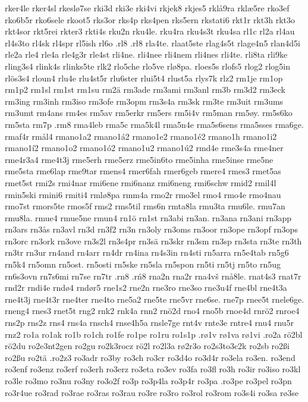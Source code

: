 {{rker4le
rker4sl
rkeslø7se
rki3d
rki3e
rki4vi
rkjek8
rkjes5
rklå9ra
rklæ5re
rko3ef
rko6b5r
rko6sele
rkoot5
rks3or
rks4p
rks4pen
rks5ern
rkstati6
rkt1r
rkt3h
rkt3o
rkt4sor
rkt5rei
rkter3
rkti4s
rku2n
rku4le.
rku4ra
rku4s3t
rku4sa
rl1c
rl2a
rl4au
rl4s3to
rl4sk
rl4spr
rl5ish
rl6o
.rl8
.rł8
rla4te.
rlaat5ste
rlag4s5t
rlage4n5
rlan4d5i
rle2a
rle4
rle4a
rle4g3r
rle4st
rli4ne.
rli4nee
rli4nem
rli4nes
rli4te.
rli8ta
rli9ke
rling3s4
rlink4s
rlinks5te
rlk2
rlo5che
rlo5ve
rlø8pa.
rloes5s
rlofs5
rlog2
rlog5in
rlös3s4
rloun4
rlu4e
rlu4st5r
rlu6ster
rlui5t4
rlust5a
rlys7k
rlz2
rm1je
rm1op
rm1p2
rm1sl
rm1st
rm1su
rm2ä
rm3ade
rm3ami
rm3anl
rm3b
rm3d2
rm3eck
rm3ing
rm3inh
rm3iso
rm3ofe
rm3opm
rm3s4a
rm3sk
rm3te
rm3uit
rm3ums
rm3umt
rm4ans
rm4es
rm5av
rm5erkr
rm5ers
rm5i4v
rm5man
rm5øy.
rm5s6ko
rm5sta
rm7p
.rm8
rma4leb
rma5c
rma5k4l
rma5n4e
rma5s6sens
rma5sses
rma6ge.
rmaf4r
rmål4
rmano1a2
rmano1á2
rmano1e2
rmano1é2
rmano1h
rmano1i2
rmano1í2
rmano1o2
rmano1ó2
rmano1u2
rmano1ú2
rmd4e
rme3s4a
rme4ner
rme4r3a4
rme4t3j
rme5erh
rme5erz
rme5in6to
rme5inha
rme5inse
rme5ne
rme5sta
rme6lap
rme9tar
rmens4
rmer6fah
rmer6geb
rmere4
rmes3
rmet5as
rmet5st
rmi2s
rmi4nar
rmi6ene
rmi6nanz
rmi6neng
rmi6schw
rmid2
rmil4l
rmin5ski
rmini6
rmiti4
rmlø8pa
rmm4a
rmo2r
rmo3el
rmo4
rmo4e
rmo4nau
rmo7st
rmors5te
rmos5f
rms2
rms5til
rms6n
rmta8la
rmu3ta
rmu6le.
rmu7an
rmu8la.
rmue4
rmue5ne
rmun4
rn1ö
rn1st
rn3abi
rn3an.
rn3ana
rn3ani
rn3app
rn3ars
rn3ås
rn3avl
rn3d
rn3f2
rn3n
rn3oly
rn3oms
rn3oor
rn3ope
rn3opf
rn3ops
rn3orc
rn3ork
rn3ove
rn3s2l
rn3s4pr
rn3sä
rn3skr
rn3sm
rn3sp
rn3sta
rn3te
rn3th
rn3tr
rn3ur
rn4and
rn4arr
rn4dr
rn4ina
rn4s3in
rn4sti
rn5arra
rn5e4tab
rn5g6
rn5k4
rn5omn
rn5ost.
rn5osti
rn5ske
rn5sla
rn5spon
rn5ti
rn5tj
rn5to
rn5ug
rn6s3ovn
rn7s6mi
rn7se
rn7tr
.rn8
.rń8
rna2n
rna2r
rna4vš
rnå8le.
rnat4s3
rnat7r
rnd2r
rndi4e
rndø4
rndør5
rne1s2
rne2n
rne3ro
rne3so
rne3u4f
rne4bl
rne4t3a
rne4t3j
rne4t3r
rne4ter
rne4to
rne5a2
rne5te
rne5vr
rne6se.
rne7p
rnee5t
rnele6ge.
rneng4
rnes3
rnet5t
rng2
rnk2
rnk4a
rnn2
rnö2d
rno4
rno5b
rnoe4d
rnrö2
rnroe4
rns2p
rns2z
rns4
rns4a
rnsch4
rnse4h5a
rnsle7ge
rnt4v
rnte3e
rntre4
rnu4
rnu5r
rnz2
ro1a
ro1ak
ro1b
ro1ch
ro1fe
ro1pe
ro1ru
ro1s1p
.rø1v
rø1va
rø1vi
.ro2a
rö2bl
rö2du
ro2e3nt2gen
ro2gu
ro2k3rocz
rö2l
ro2l3a
rø2r3o
ro2s3to3c2k
ro2sb
ro2ßi
ro2ßu
ro2tä
.ro2z3
ro3adr
ro3by
ro3ch
ro3cr
ro3d4o
ro3d4r
ro3ela
ro3en.
ro3end
ro3enf
ro3enz
ro3erf
ro3erh
ro3erz
ro3eta
ro3ev
ro3fa
ro3fl
ro3h
ro3ir
ro3iso
ro3kl
ro3le
ro3mo
ro3nu
ro3ny
ro3o2f
ro3p
ro3p4la
ro3p4r
ro3pa
.ro3pe
ro3pel
ro3pn
ro3r4ue
ro3rad
ro3rae
ro3ras
ro3rau
ro3re
ro3ro
ro3rol
ro3rom
ro3s4i
ro3sa
rø3se
}}

